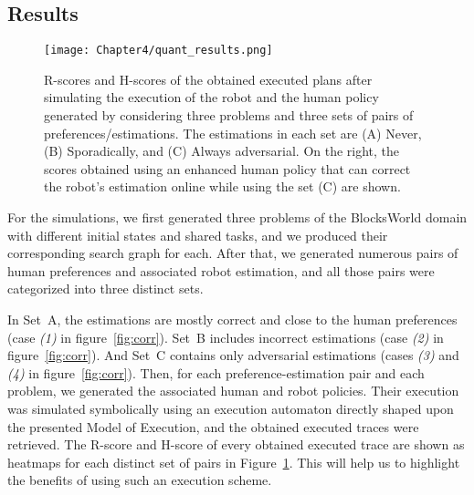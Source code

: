     \subsection{Results}

\begin{figure}
    \centering
    \texttt{[image: Chapter4/quant\_results.png]}
    \caption{
    R-scores and H-scores of the obtained executed plans after simulating the execution of the robot and the human policy generated by considering three problems and three sets of pairs of preferences/estimations. 
    The estimations in each set are (A) Never, (B) Sporadically, and (C) Always adversarial. On the right, the scores obtained using an enhanced human policy that can correct the robot's estimation online while using the set (C) are shown.
    }    
    \label{fig:heatmaps}
\end{figure}

For the simulations, we first generated three problems of the BlocksWorld domain with different initial states and shared tasks, and we produced their corresponding search graph for each. 
After that, we generated numerous pairs of human preferences and associated robot estimation, and all those pairs were categorized into three distinct sets.

In Set~A, the estimations are mostly correct and close to the human preferences (case \textit{(1)} in figure~\ref{fig:corr}). Set~B includes incorrect estimations (case \textit{(2)} in figure~\ref{fig:corr}). And Set~C contains only adversarial estimations (cases \textit{(3)} and \textit{(4)} in figure~\ref{fig:corr}).
Then, for each preference-estimation pair and each problem, we generated the associated human and robot policies. Their execution was simulated symbolically using an execution automaton directly shaped upon the presented Model of Execution, and the obtained executed traces were retrieved.
The R-score and H-score of every obtained executed trace are shown as heatmaps for each distinct set of pairs in Figure~\ref{fig:heatmaps}. This will help us to highlight the benefits of using such an execution scheme.


